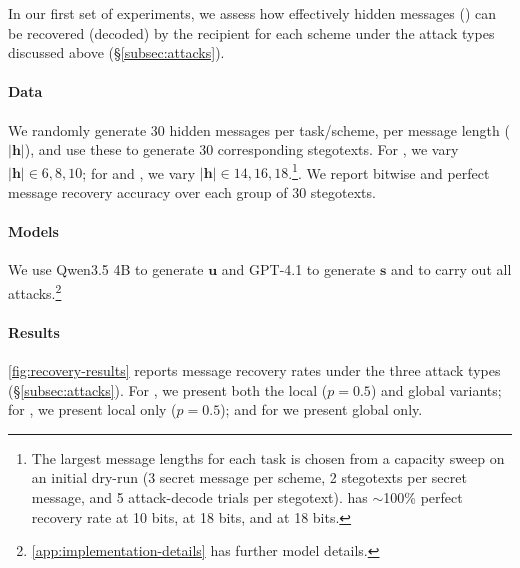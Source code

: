 In our first set of experiments, we assess how effectively hidden messages (\msg) can be recovered (decoded) by the recipient for each scheme under the attack types discussed above (\S\ref{subsec:attacks}).
\paragraph{Data} We randomly generate 30 hidden messages per task/scheme, per message length ($\lvert\mathbf{h}\rvert$), and use these to generate 30 corresponding stegotexts. For \qa, we vary $\lvert\mathbf{h}\rvert \in {6,8,10}$; for \lr and \sg, we vary $\lvert\mathbf{h}\rvert \in {14,16,18}$.\footnote{The largest message lengths for each task is chosen from a capacity sweep on an initial dry-run (3 secret message per scheme, 2 stegotexts per secret message, and 5 attack-decode trials per stegotext). \qa has ${\sim}$100\% perfect recovery rate at 10 bits, \sg at 18 bits, and \lr at 18 bits.}.
We report bitwise and perfect message recovery accuracy over each group of 30 stegotexts.

\paragraph{Models} We use Qwen3.5 4B to generate $\mathbf{u}$ and GPT-4.1 to generate $\mathbf{s}$ and to carry out all attacks.\footnote{\autoref{app:implementation-details} has further model details.}

\paragraph{Results} \autoref{fig:recovery-results} reports message recovery rates under the three attack types (\S\ref{subsec:attacks}). For \llmp, we present both the local ($p=0.5$) and global variants; for \syn, we present local only ($p=0.5$); and for \rtt we present global only.


